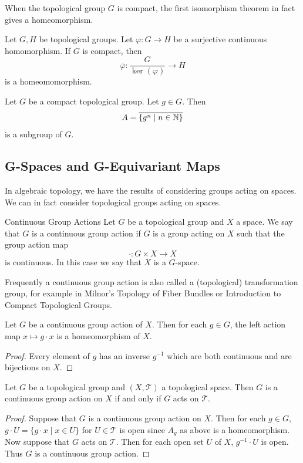 \documentclass[a4paper]{article}
\begin{document}
When the topological group $G$ is compact, the first isomorphism theorem in fact gives a homeomorphism. 

\begin{prp}{}{} Let $G,H$ be topological groups. Let $\varphi:G\to H$ be a surjective continuous homomorphism. If $G$ is compact, then $$\overline{\varphi}:\frac{G}{\ker(\varphi)}\to H$$ is a homeomomorphism. 
\end{prp}

\begin{prp}{}{} Let $G$ be a compact topological group. Let $g\in G$. Then $$A=\overline{\{g^n\;|\;n\in\mathbb{N}\}}$$ is a subgroup of $G$. 
\end{prp}

\subsection{G-Spaces and G-Equivariant Maps}
In algebraic topology, we have the results of considering groups acting on spaces. We can in fact consider topological groups acting on spaces. 

\begin{defn}{Continuous Group Actions}{} Let $G$ be a topological group and $X$ a space. We say that $G$ is a continuous group action if $G$ is a group acting on $X$ such that the group action map $$\cdot:G\times X\to X$$ is continuous. In this case we say that $X$ is a $G$-space. 
\end{defn}

Frequently a continuous group action is also called a (topological) transformation group, for example in Milnor's Topology of Fiber Bundles or Introduction to Compact Topological Groups. 

\begin{prp}{}{} Let $G$ be a continuous group action of $X$. Then for each $g\in G$, the left action map $x\mapsto g\cdot x$ is a homeomorphism of $X$. \tcbline
\begin{proof}
Every element of $g$ has an inverse $g^{-1}$ which are both continuous and are bijections on $X$. 
\end{proof}
\end{prp}

\begin{prp}{}{} Let $G$ be a topological group and $(X,\mathcal{T})$ a topological space. Then $G$ is a continuous group action on $X$ if and only if $G$ acts on $\mathcal{T}$. \tcbline
\begin{proof}
Suppose that $G$ is a continuous group action on $X$. Then for each $g\in G$, $g\cdot U=\{g\cdot x\;|\; x\in U\}$ for $U\in\mathcal{T}$ is open since $A_g$ as above is a homeomorphism. Now suppose that $G$ acts on $\mathcal{T}$. Then for each open set $U$ of $X$, $g^{-1}\cdot U$ is open. Thus $G$ is a continuous group action. 
\end{proof}
\end{prp}
\end{document}
